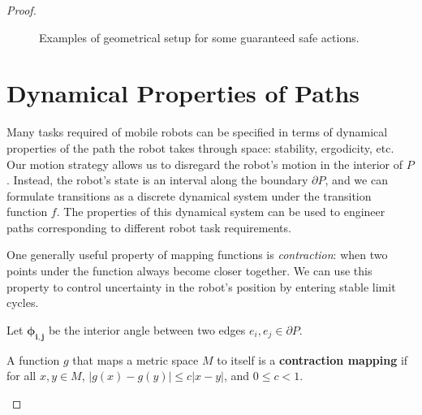\documentclass[]{styles/svproc}  %
\begin{document}
\begin{proof}
\begin{figure}
\begin{subfigure}{0.4\textwidth}
\centering
{}
\end{subfigure}
\caption{Examples of geometrical setup for some guaranteed safe actions.}
\label{fig:two_safe_cases}
\end{figure}


\section{Dynamical Properties of Paths}


Many tasks required of mobile robots can be specified in terms of dynamical properties of
the path the robot takes through space: stability, ergodicity, etc.
Our motion strategy allows us to disregard the robot's motion in the interior of
$P$. Instead, the robot's state is an interval 
along the boundary $\partial P$, and we can formulate transitions as a discrete
dynamical system under the transition function $f$. The properties of this
dynamical system can be used to engineer paths corresponding to different robot
task requirements.

One generally useful property of mapping functions is \emph{contraction}: 
when two points under the function always become closer together. We can use this property to control
uncertainty in the robot's position by entering stable limit cycles.

\begin{definition}
Let $\bm{\phi_{i,j}}$ be the interior angle between two edges $e_i, e_j \in \partial P$. 
\end{definition}

\begin{definition}

A function $g$ that maps a metric space $M$ to itself is a \textbf{contraction
mapping} if for all
$x, y \in M$, $\lvert g(x) - g(y) \rvert \leq c \lvert x-y \rvert$, and $0 \leq c < 1$.
\end{definition}


\end{proof}
\end{document}
